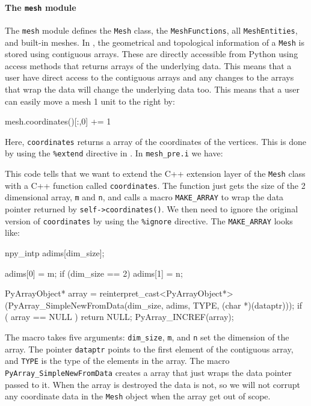 \begin{code}
\paragraph{The \texttt{mesh} module}
The \texttt{mesh} module defines the \texttt{Mesh} class, the \texttt{MeshFunctions}, all \texttt{MeshEntities}, and built-in meshes. In \dolfin,  the geometrical and topological information of a \texttt{Mesh} is stored using contiguous arrays. These are directly accessible from Python using access methods that returns \numpy arrays of the underlying data. This means that a user have direct access to the contiguous arrays and any changes to the \numpy arrays that wrap the data will change the underlying data too. This means that a user can easily move a mesh 1 unit to the right by:
\begin{code}
mesh.coordinates()[:,0] += 1
\end{code}
Here, \texttt{coordinates} returns a \numpy array of the coordinates of the vertices. This is done by using the \texttt{\%extend} directive in \swig. In \texttt{mesh\_pre.i} we have:
This code tells \swig that we want to extend the C++ extension layer of the \texttt{Mesh} class with a C++ function called \texttt{coordinates}. The function just gets the size of the 2 dimensional array, \texttt{m} and \texttt{n}, and calls a macro \texttt{MAKE\_}\texttt{ARRAY} to wrap the data pointer returned by \texttt{self->}\texttt{coordinates()}. We then need to ignore the original version of \texttt{coordinates} by using the \texttt{\%ignore} directive. The \texttt{MAKE\_}\texttt{ARRAY} looks like:
\begin{code}
  npy_intp adims[dim_size];

  adims[0] = m;
  if (dim_size == 2)
    adims[1] = n;

  PyArrayObject* array = reinterpret_cast<PyArrayObject*>(PyArray_SimpleNewFromData(dim_size, adims, TYPE, (char *)(dataptr)));
  if ( array == NULL ) return NULL;
  PyArray_INCREF(array);
\end{code}
The macro takes five arguments: \texttt{dim\_size}, \texttt{m}, and \texttt{n} set the dimension of the \numpy array.
The pointer \texttt{dataptr} points to the first element of the contiguous array, and \texttt{TYPE} is the type of the elements in the array. The \numpy macro \texttt{PyArray\_}\texttt{SimpleNewFromData} creates a \numpy array that just wraps the data pointer passed to it. When the \numpy array is destroyed the data is not, so we will not corrupt any coordinate data in the \texttt{Mesh} object when the \numpy array get out of scope. \par


\end{code}
